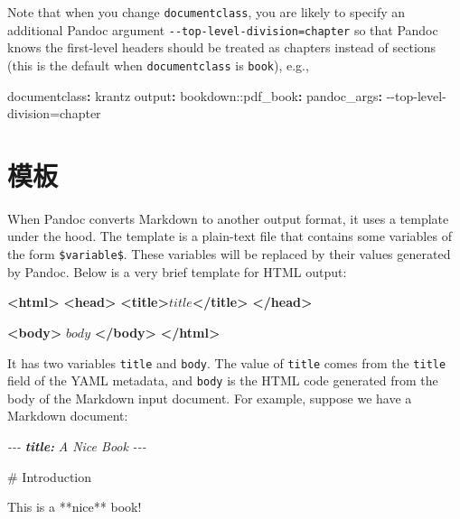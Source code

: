 \documentclass[
  12pt,
]{krantz}
\newenvironment{Shaded}{\begin{snugshade}}{\end{snugshade}}
\newcommand{\AnnotationTok}[1]{\textcolor[rgb]{0.56,0.35,0.01}{\textbf{\textit{#1}}}}
\newcommand{\AttributeTok}[1]{\textcolor[rgb]{0.77,0.63,0.00}{#1}}
\newcommand{\CommentTok}[1]{\textcolor[rgb]{0.56,0.35,0.01}{\textit{#1}}}
\newcommand{\FunctionTok}[1]{\textcolor[rgb]{0.00,0.00,0.00}{#1}}
\newcommand{\KeywordTok}[1]{\textcolor[rgb]{0.13,0.29,0.53}{\textbf{#1}}}
\newcommand{\NormalTok}[1]{#1}
\theoremstyle{definition}
\theoremstyle{definition}
\theoremstyle{definition}
\theoremstyle{definition}
\theoremstyle{remark}
\begin{document}
Note that when you change \texttt{documentclass}, you are likely to specify an additional Pandoc argument \texttt{-\/-top-level-division=chapter} so that Pandoc knows the first-level headers should be treated as chapters instead of sections (this is the default when \texttt{documentclass} is \texttt{book}), e.g.,

\begin{Shaded}
\begin{Highlighting}[]
\FunctionTok{documentclass}\KeywordTok{:}\AttributeTok{ krantz}
\FunctionTok{output}\KeywordTok{:}
\AttributeTok{  bookdown:}\FunctionTok{:pdf\_book}\KeywordTok{:}
\AttributeTok{    }\FunctionTok{pandoc\_args}\KeywordTok{:}\AttributeTok{ {-}{-}top{-}level{-}division=chapter}
\end{Highlighting}
\end{Shaded}

\hypertarget{ux6a21ux677f}{%
\section{模板}\label{ux6a21ux677f}}

When Pandoc converts Markdown to another output format, it uses a template under the hood. The template is a plain-text file that contains some variables of the form \texttt{\$variable\$}. These variables will be replaced by their values generated by Pandoc. Below is a very brief template for HTML output:

\begin{Shaded}
\begin{Highlighting}[]
\KeywordTok{\textless{}html\textgreater{}}
  \KeywordTok{\textless{}head\textgreater{}}
    \KeywordTok{\textless{}title\textgreater{}}\NormalTok{$title$}\KeywordTok{\textless{}/title\textgreater{}}
  \KeywordTok{\textless{}/head\textgreater{}}
  
  \KeywordTok{\textless{}body\textgreater{}}
\NormalTok{  $body$}
  \KeywordTok{\textless{}/body\textgreater{}}
\KeywordTok{\textless{}/html\textgreater{}}
\end{Highlighting}
\end{Shaded}

It has two variables \texttt{title} and \texttt{body}. The value of \texttt{title} comes from the \texttt{title} field of the YAML metadata, and \texttt{body} is the HTML code generated from the body of the Markdown input document. For example, suppose we have a Markdown document:

\begin{Shaded}
\begin{Highlighting}[]
\CommentTok{{-}{-}{-}}
\AnnotationTok{title:}\CommentTok{ A Nice Book}
\CommentTok{{-}{-}{-}}

\FunctionTok{\# Introduction}

\NormalTok{This is a **nice** book!}
\end{Highlighting}
\end{Shaded}
\end{document}

